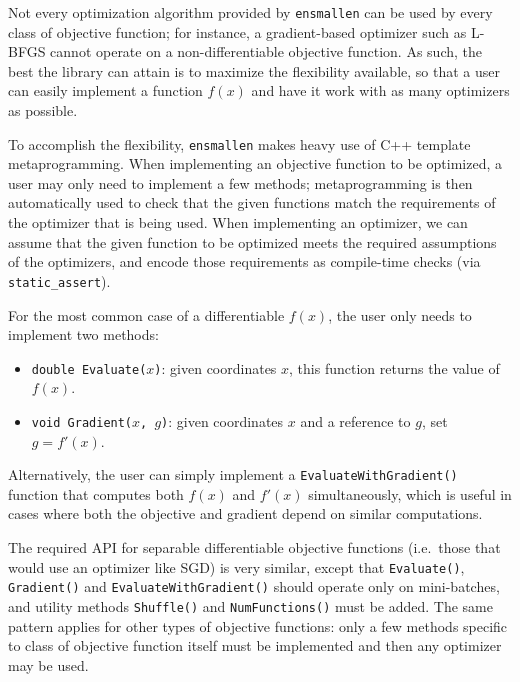 \documentclass{article}
\begin{document}
Not every optimization algorithm provided by {\tt ensmallen} can be
used by every class of objective function; for instance, a gradient-based
optimizer such as L-BFGS cannot operate on a non-differentiable objective
function.
As such, the best the library can attain is to maximize the flexibility
available, so that a user can easily implement a function $f(x)$ and have it
work with as many optimizers as possible.

To accomplish the flexibility, {\tt ensmallen} makes heavy use of
C++ template metaprogramming.
When implementing an objective function to be optimized,
a user may only need to implement a few methods; metaprogramming is then automatically
used to check that the given functions match the requirements of the
optimizer that is being used.  When implementing an optimizer, we can assume
that the given function to be optimized meets the required assumptions of the
optimizers, and encode those requirements as compile-time checks
(via \texttt{\small static\_assert}).

For the most common case of a differentiable $f(x)$, the user only needs to
implement two methods:

\vspace*{-0.3em}
\begin{itemize} \itemsep -1pt
  \item \texttt{\small double Evaluate($x$)}: given coordinates $x$, this function
returns the value of $f(x)$.
  \item \texttt{\small void Gradient($x$, $g$)}: given coordinates $x$ and a reference
to $g$, set $g = f'(x)$.
\end{itemize}
\vspace*{-0.3em}

Alternatively, the user can simply implement a \texttt{\small EvaluateWithGradient()}
function that computes both $f(x)$ and $f'(x)$ simultaneously, which is useful
in cases where both the objective and gradient depend on similar computations.

The required API for separable differentiable objective functions (i.e.~those
that would use an optimizer like SGD) is very similar, except that
\texttt{\small Evaluate()}, \texttt{\small Gradient()} and \texttt{\small EvaluateWithGradient()}
should operate only on mini-batches, and utility methods \texttt{\small Shuffle()} and
\texttt{\small NumFunctions()} must be added.  The same pattern applies for other
types of objective functions: only a few methods specific to class of objective
function itself must be implemented and then any optimizer may be used.
\end{document}
